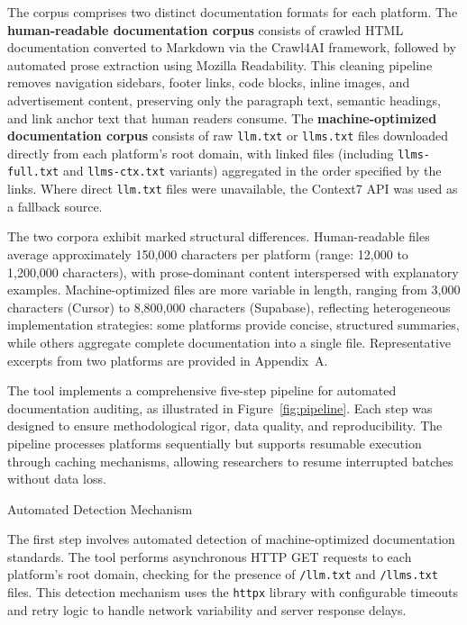 \documentclass[10pt,conference,a4paper]{IEEEtran}
\makeatletter
\let\oldsubsubsection\subsubsection
\renewcommand{\subsubsection}{%
    \@ifstar{\subsubsectionStar}{\subsubsectionNoStar}%
}
\newcommand{\subsubsectionStar}[1]{%
    \oldsubsubsection*{\textit{#1}}%
}
\newcommand{\subsubsectionNoStar}[1]{%
    \oldsubsubsection{\textit{#1}}%
}
\makeatother
\begin{document}
The corpus comprises two distinct documentation formats for each platform. The \textbf{human-readable documentation corpus} consists of crawled HTML documentation converted to Markdown via the Crawl4AI framework, followed by automated prose extraction using Mozilla Readability. This cleaning pipeline removes navigation sidebars, footer links, code blocks, inline images, and advertisement content, preserving only the paragraph text, semantic headings, and link anchor text that human readers consume. The \textbf{machine-optimized documentation corpus} consists of raw \texttt{llm.txt} or \texttt{llms.txt} files downloaded directly from each platform's root domain, with linked files (including \texttt{llms-full.txt} and \texttt{llms-ctx.txt} variants) aggregated in the order specified by the links. Where direct \texttt{llm.txt} files were unavailable, the Context7 API was used as a fallback source.

The two corpora exhibit marked structural differences. Human-readable files average approximately 150,000 characters per platform (range: 12,000 to 1,200,000 characters), with prose-dominant content interspersed with explanatory examples. Machine-optimized files are more variable in length, ranging from 3,000 characters (Cursor) to 8,800,000 characters (Supabase), reflecting heterogeneous implementation strategies: some platforms provide concise, structured summaries, while others aggregate complete documentation into a single file. Representative excerpts from two platforms are provided in Appendix~A.

The tool implements a comprehensive five-step pipeline for automated documentation auditing, as illustrated in Figure~\ref{fig:pipeline}. Each step was designed to ensure methodological rigor, data quality, and reproducibility. The pipeline processes platforms sequentially but supports resumable execution through caching mechanisms, allowing researchers to resume interrupted batches without data loss.

\subsubsection{Automated Detection Mechanism}

The first step involves automated detection of machine-optimized documentation standards. The tool performs asynchronous HTTP GET requests to each platform's root domain, checking for the presence of \texttt{/llm.txt} and \texttt{/llms.txt} files. This detection mechanism uses the \texttt{httpx} library with configurable timeouts and retry logic to handle network variability and server response delays.
\end{document}
